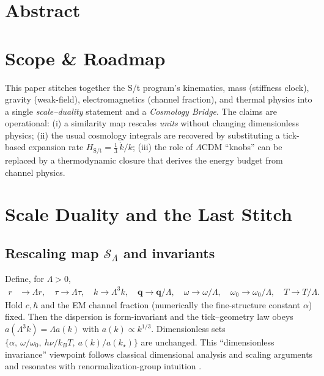 \documentclass[11pt,oneside]{article}
\title{\PaperTitleMain}
\author{\Authors}
\author{\AuthorName}
\author{Author Name}
\date{\today}
\begin{document}
\maketitle


\clearpage
\section*{Abstract}

\clearpage


%

\section{Scope \& Roadmap}
This paper stitches together the S/t program's kinematics, mass (stiffness clock), gravity (weak-field), electromagnetics (channel fraction), and thermal physics
into a single \emph{scale--duality} statement and a \emph{Cosmology Bridge}. The claims are operational:
(i) a similarity map rescales \emph{units} without changing dimensionless physics; (ii) the usual cosmology
integrals are recovered by substituting a tick-based expansion rate $H_{\text{S/t}}=\tfrac13\,\dot k/k$; (iii) the role of $\Lambda$CDM
``knobs'' can be replaced by a thermodynamic closure that derives the energy budget from channel physics.

\section{Scale Duality and the Last Stitch}
\subsection{Rescaling map $\mathcal S_\Lambda$ and invariants}
Define, for $\Lambda>0$,
\begin{align*}
r&\to \Lambda r,\quad \tau\to \Lambda \tau,\quad k\to \Lambda^3 k,\quad \mathbf q\to \mathbf q/\Lambda,\quad
\omega\to \omega/\Lambda,\quad \omega_0\to \omega_0/\Lambda,\quad T\to T/\Lambda.
\end{align*}
Hold $c,\hbar$ and the EM channel fraction (numerically the fine-structure constant $\alpha$) fixed.
Then the dispersion is form-invariant and the tick--geometry law obeys $a(\Lambda^3k)=\Lambda a(k)$ with
$a(k)\propto k^{1/3}$. Dimensionless sets $\{\alpha,\ \omega/\omega_0,\ h\nu/k_BT,\ a(k)/a(k_\star)\}$ are unchanged.
This ``dimensionless invariance'' viewpoint follows classical dimensional analysis and scaling arguments \cite{buckingham1914,barenblatt1996} and resonates with renormalization-group intuition \cite{wilson1971,duff2002trialogue}.
\end{document}

